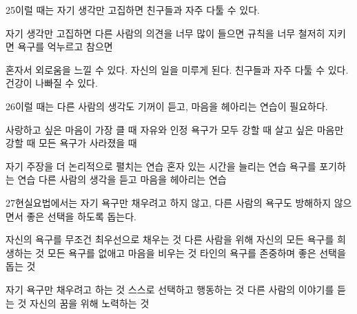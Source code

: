 \documentclass[fs85,seriesRus]{korfarm-base}
\begin{document}
\begin{kfSentenceUnit}{25}{이럴 때는 자기 생각만 고집하면 친구들과 자주 다툴 수 있다.}
\begin{kfChoices}
\kfChoice 자기 생각만 고집하면
\kfChoice 다른 사람의 의견을 너무 많이 들으면
\kfChoice 규칙을 너무 철저히 지키면
\kfChoice 욕구를 억누르고 참으면
\end{kfChoices}
\begin{kfChoices}
\kfChoice 혼자서 외로움을 느낄 수 있다.
\kfChoice 자신의 일을 미루게 된다.
\kfChoice 친구들과 자주 다툴 수 있다.
\kfChoice 건강이 나빠질 수 있다.
\end{kfChoices}
\end{kfSentenceUnit}

\begin{kfSentenceUnit}{26}{이럴 때는 다른 사람의 생각도 기꺼이 듣고, 마음을 헤아리는 연습이 필요하다.}
\begin{kfChoices}
\kfChoice 사랑하고 싶은 마음이 가장 클 때
\kfChoice 자유와 인정 욕구가 모두 강할 때
\kfChoice 살고 싶은 마음만 강할 때
\kfChoice 모든 욕구가 사라졌을 때
\end{kfChoices}
\begin{kfChoices}
\kfChoice 자기 주장을 더 논리적으로 펼치는 연습
\kfChoice 혼자 있는 시간을 늘리는 연습
\kfChoice 욕구를 포기하는 연습
\kfChoice 다른 사람의 생각을 듣고 마음을 헤아리는 연습
\end{kfChoices}
\end{kfSentenceUnit}

\begin{kfSentenceUnit}{27}{현실요법에서는 자기 욕구만 채우려고 하지 않고, 다른 사람의 욕구도 방해하지 않으면서 좋은 선택을 하도록 돕는다.}
\begin{kfChoices}
\kfChoice 자신의 욕구를 무조건 최우선으로 채우는 것
\kfChoice 다른 사람을 위해 자신의 모든 욕구를 희생하는 것
\kfChoice 모든 욕구를 없애고 마음을 비우는 것
\kfChoice 타인의 욕구를 존중하며 좋은 선택을 돕는 것
\end{kfChoices}
\begin{kfChoices}
\kfChoice 자기 욕구만 채우려고 하는 것
\kfChoice 스스로 선택하고 행동하는 것
\kfChoice 다른 사람의 이야기를 듣는 것
\kfChoice 자신의 꿈을 위해 노력하는 것
\end{kfChoices}
\end{kfSentenceUnit}
\end{document}
